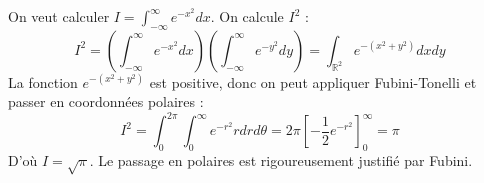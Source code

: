\begin{application}
    On veut calculer $I = \int_{-\infty}^\infty e^{-x^2} dx$. On calcule $I^2$ :
    $$ I^2 = \left( \int_{-\infty}^\infty e^{-x^2} dx \right) \left( \int_{-\infty}^\infty e^{-y^2} dy \right) = \int_{\mathbb{R}^2} e^{-(x^2+y^2)} dx dy $$
    La fonction $e^{-(x^2+y^2)}$ est positive, donc on peut appliquer Fubini-Tonelli et passer en coordonnées polaires :
    $$ I^2 = \int_0^{2\pi} \int_0^\infty e^{-r^2} r dr d\theta = 2\pi \left[ -\frac{1}{2} e^{-r^2} \right]_0^\infty = \pi $$
    D'où $I = \sqrt{\pi}$. Le passage en polaires est rigoureusement justifié par Fubini.
\end{application}